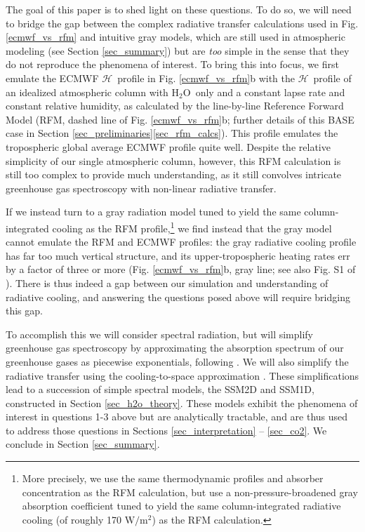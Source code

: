 \documentclass{ametsoc}
\newcommand{\Wmsq}{\ensuremath{\mathrm{W/m^2}}}
\newcommand{\cotwo}{\ensuremath{\mathrm{CO_2}}}
\newcommand{\htwo}{\ensuremath{\mathrm{H_2O}}}
\newcommand{\ch}{\ensuremath{\mathcal{H}}}
\begin{document}
The goal of this paper is to shed light on these questions. To do so, we will need to bridge the gap between the complex radiative transfer calculations used  in Fig. \ref{ecmwf_vs_rfm}  and  intuitive gray models, which are still used in atmospheric modeling (see Section \ref{sec_summary}) but are \emph{too} simple in the sense that they do not reproduce the phenomena of interest. To bring this into focus, we first emulate the ECMWF \ch\ profile in Fig. \ref{ecmwf_vs_rfm}b with the \ch\ profile  of an idealized
 atmospheric column  with \htwo\ only and a constant lapse rate and constant relative humidity, as calculated by the line-by-line Reference Forward Model (RFM, dashed line of Fig. \ref{ecmwf_vs_rfm}b;  further details of this BASE case in Section \ref{sec_preliminaries}\ref{sec_rfm_calcs}). This profile emulates the tropospheric global average ECMWF profile quite well. Despite the relative simplicity of our single atmospheric column, however, this RFM calculation is still too complex to provide much understanding, as it still convolves intricate greenhouse gas spectroscopy with non-linear radiative transfer. 

If we instead turn to  a gray radiation model tuned to yield the same column-integrated cooling as the RFM profile,\footnote{More precisely, we use the same thermodynamic profiles and absorber concentration as the RFM calculation, but use a non-pressure-broadened gray absorption coefficient tuned to yield the same column-integrated radiative cooling (of roughly 170 \Wmsq) as the RFM calculation.} we find instead that the gray model cannot emulate the RFM and ECMWF profiles: the gray radiative cooling profile has far too much vertical structure, and its upper-tropospheric heating rates err by a factor of three or more (Fig. \ref{ecmwf_vs_rfm}b, gray line; see also Fig. S1 of \cite{seeley2019b}). There is thus indeed a gap between our simulation and understanding of radiative cooling, and answering the questions posed above will require bridging this gap.

To accomplish this we will consider spectral radiation, but will simplify greenhouse gas spectroscopy by approximating the absorption spectrum of our greenhouse gases as piecewise exponentials, following \cite{wilson2012}. We will also simplify the radiative transfer using  the cooling-to-space approximation \citep[e.g.][]{jeevanjee2019b,petty2006, green1967,rodgers1966}. These simplifications lead to a succession of simple spectral models, the SSM2D and SSM1D, constructed in Section \ref{sec_h2o_theory}. These models exhibit the phenomena of interest in questions 1-3 above but are analytically tractable, and are thus used  to address those questions in Sections \ref{sec_interpretation} --  \ref{sec_co2}. We conclude in Section \ref{sec_summary}.
\end{document}

